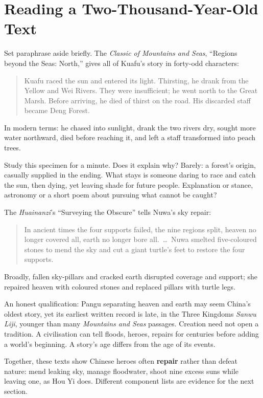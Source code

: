 \section{Reading a Two-Thousand-Year-Old Text}
Set paraphrase aside briefly. The \textit{Classic of Mountains and Seas}, ``Regions beyond the Seas: North,'' gives all of Kuafu's story in forty-odd characters:

\begin{quote}
Kuafu raced the sun and entered its light. Thirsting, he drank from the Yellow and Wei Rivers. They were insufficient; he went north to the Great Marsh. Before arriving, he died of thirst on the road. His discarded staff became Deng Forest.
\end{quote}
In modern terms: he chased into sunlight, drank the two rivers dry, sought more water northward, died before reaching it, and left a staff transformed into peach trees.

Study this specimen for a minute. Does it explain why? Barely: a forest's origin, casually supplied in the ending. What stays is someone daring to race and catch the sun, then dying, yet leaving shade for future people. Explanation or stance, astronomy or a short poem about pursuing what cannot be caught?

The \textit{Huainanzi}'s ``Surveying the Obscure'' tells Nuwa's sky repair:

\begin{quote}
In ancient times the four supports failed, the nine regions split, heaven no longer covered all, earth no longer bore all. \,\ldots\, Nuwa smelted five-coloured stones to mend the sky and cut a giant turtle's feet to restore the four supports.
\end{quote}
Broadly, fallen sky-pillars and cracked earth disrupted coverage and support; she repaired heaven with coloured stones and replaced pillars with turtle legs.

An honest qualification: Pangu separating heaven and earth may seem China's oldest story, yet its earliest written record is late, in the Three Kingdoms \textit{Sanwu Liji}, younger than many \textit{Mountains and Seas} passages. Creation need not open a tradition. A civilisation can tell floods, heroes, repairs for centuries before adding a world's beginning. A story's age differs from the age of its events.

Together, these texts show Chinese heroes often \textbf{repair} rather than defeat nature: mend leaking sky, manage floodwater, shoot nine excess suns while leaving one, as Hou Yi does. Different component lists are evidence for the next section.


